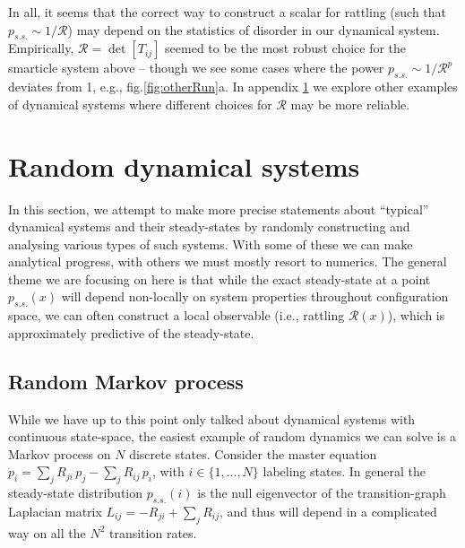 \documentclass[reprint,prx]{revtex4-1}
\renewcommand{\=}[1]{\stackrel{#1}{=}} %
\renewcommand{\(}{\left (}
\renewcommand{\)}{\right  )}
\renewcommand{\[}{\left [}
\renewcommand{\]}{\right ]}
\newcommand{\<}{\left <}
\renewcommand{\>}{\right >}
\theoremstyle{definition}
\theoremstyle{remark}
\begin{document}
In all, it seems that the correct way to construct a scalar for rattling (such that $ p_{s.s.}\sim 1/\mathcal{R} $) may depend on the statistics of disorder in our dynamical system. Empirically, $ \mathcal{R} = \det\[T_{ij}\] $ seemed to be the most robust choice for the smarticle system above -- though we see some cases where the power $ p_{s.s.} \sim 1/\mathcal{R}^p $ deviates from 1, e.g., fig.\ref{fig:otherRun}a. In appendix \ref{app:randDynam} we explore other examples of dynamical systems where different choices for $ \mathcal{R} $ may be more reliable.

\section{Random dynamical systems} \label{app:randDynam}

In this section, we attempt to make more precise statements about ``typical'' dynamical systems and their steady-states by randomly constructing and analysing various types of such systems. With some of these we can make analytical progress, with others we must mostly resort to numerics. The general theme we are focusing on here is that while the exact steady-state at a point $ p_{s.s.}(x) $ will depend non-locally on system properties throughout configuration space, we can often construct a local observable (i.e., rattling $ \mathcal{R}(x) $), which is approximately predictive of the steady-state. 

\subsection{Random Markov process} \label{app:randMarkov}

While we have up to this point only talked about dynamical systems with continuous state-space, the easiest example of random dynamics we can solve is a Markov process on $ N $ discrete states. Consider the master equation $ \dot{p}_i= \sum_j R_{ji}\, p_j - \sum_j R_{ij}\, p_i $, with $ i\in\{1,...,N\} $ labeling states. In general the steady-state distribution $ p_{s.s.}(i) $ is the null eigenvector of the transition-graph Laplacian matrix $ L_{ij}= -R_{ji} + \sum_j R_{ij} $, and thus will depend in a complicated way on all the $ N^2 $ transition rates. 
\end{document}
